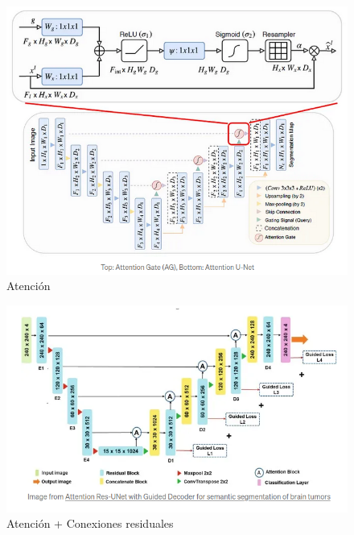 \begin{frame}[allowframebreaks]
    \begin{figure}
        \centering
        \includegraphics[scale=0.3]{img/section_07/Attention_UNet.png}
        \caption{Atención}
        \label{fig:attn-unet}
    \end{figure}

    \begin{figure}
        \centering
        \includegraphics[scale=0.3]{img/section_07/Attention_ResUNet.png}
        \caption{Atención + Conexiones residuales}
        \label{fig:att-res-unet}
    \end{figure}
\end{frame}

